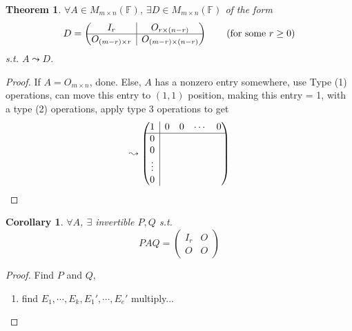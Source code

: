\documentclass[12pt]{article}
\theoremstyle{plain}
\newtheorem{theorem}{Theorem}[subsection]
\newtheorem{corollary}{Corollary}[subsection]
\newcommand{\mF}{{\mathbb{F}}}
\newcommand{\rvline}{\hspace*{-\arraycolsep}\vline\hspace*{-\arraycolsep}}
\begin{document}
	\begin{theorem}
		$\forall A \in M_{m\times n} (\mF)$, $\exists D \in M_{m\times n}(\mF)$
		of the form
		\[
			D = 
			\begin{pmatrix}
				I_r & \rvline & O_{r \times (n-r)} \\ \hline
				O_{(m-r)\times r} & \rvline & O _{(m-r)\times(n-r)} 
			\end{pmatrix}
			\qquad (\text{for some } r\geq 0)
		\]
		s.t. $A \leadsto D$. 
	\end{theorem}
	\begin{proof}
		If $A = O_{m\times n}$, done. Else, $A$ has a nonzero entry somewhere,
		use Type (1) operations, can move this entry to $(1, 1)$ position,
		making this entry = 1, with a type (2) operations, apply type 3 
		operations to get  
		\[
			\leadsto 
			\begin{pmatrix}
				1 & \rvline & 0 & 0 & \cdots & 0\\ \hline
				0 & \rvline \\
				0 & \rvline \\
				\vdots & \rvline\\
				0 & \rvline\\
			\end{pmatrix}
		\]
		
	\end{proof}

	\begin{corollary}
		$\forall A$, $\exists$ invertible $P, Q$ s.t. 
		\[
			PAQ =
			\begin{pmatrix}
				I_r & O \\
				O & O
			\end{pmatrix}
		\]
	\end{corollary}
	\begin{proof}
		Find $P$ and $Q$, 
		\begin{enumerate}
			\item find $E_1, \cdots, E_k, E_1', \cdots, E_e'$ multiply...
		\end{enumerate}
	\end{proof}

\newpage
\end{document}

